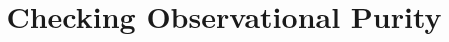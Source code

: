\documentclass{llncs}
\begin{document}
\mainmatter              %
%
\title{Checking Observational Purity}
%
%

\maketitle              %
\end{document}
